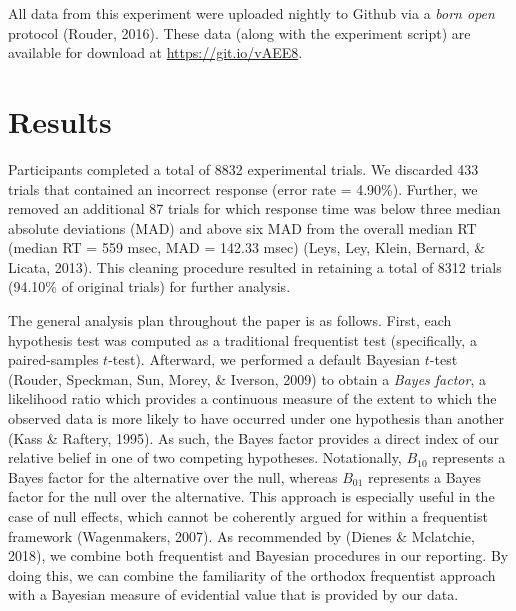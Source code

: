\documentclass[english,,man]{apa6}
\theoremstyle{definition}
\theoremstyle{definition}
\theoremstyle{definition}
\theoremstyle{remark}
\begin{document}
All data from this experiment were uploaded nightly to Github via a
\emph{born open} protocol (Rouder, 2016). These data (along with the
experiment script) are available for download at
\url{https://git.io/vAEE8}.

\hypertarget{results}{%
\section{Results}\label{results}}

Participants completed a total of 8832 experimental trials. We discarded
433 trials that contained an incorrect response (error rate = 4.90\%).
Further, we removed an additional 87 trials for which response time was
below three median absolute deviations (MAD) and above six MAD from the
overall median RT (median RT = 559 msec, MAD = 142.33 msec) (Leys, Ley,
Klein, Bernard, \& Licata, 2013). This cleaning procedure resulted in
retaining a total of 8312 trials (94.10\% of original trials) for
further analysis.

The general analysis plan throughout the paper is as follows. First,
each hypothesis test was computed as a traditional frequentist test
(specifically, a paired-samples \(t\)-test). Afterward, we performed a
default Bayesian \(t\)-test (Rouder, Speckman, Sun, Morey, \& Iverson,
2009) to obtain a \emph{Bayes factor}, a likelihood ratio which provides
a continuous measure of the extent to which the observed data is more
likely to have occurred under one hypothesis than another (Kass \&
Raftery, 1995). As such, the Bayes factor provides a direct index of our
relative belief in one of two competing hypotheses. Notationally,
\(B_{10}\) represents a Bayes factor for the alternative over the null,
whereas \(B_{01}\) represents a Bayes factor for the null over the
alternative. This approach is especially useful in the case of null
effects, which cannot be coherently argued for within a frequentist
framework (Wagenmakers, 2007). As recommended by (Dienes \& Mclatchie,
2018), we combine both frequentist and Bayesian procedures in our
reporting. By doing this, we can combine the familiarity of the orthodox
frequentist approach with a Bayesian measure of evidential value that is
provided by our data.
\end{document}
